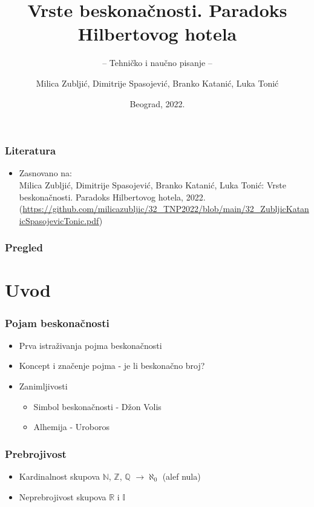 \documentclass{beamer}
\title{Vrste beskonačnosti. Paradoks Hilbertovog hotela}
\subtitle{-- Tehničko i naučno pisanje --}
\author{Milica Zubljić, Dimitrije Spasojević, Branko Katanić, Luka Tonić}
\institute{Matematički fakultet\\Univerzitet u Beogradu}
\date{
	\footnotesize{Beograd, 2022.}	
}
\begin{document}
\begin{frame}
	\thispagestyle{empty}
	\titlepage
\end{frame}

\addtocounter{framenumber}{-1}

\begin{frame}[fragile]\frametitle{Literatura}
	\begin{itemize}
		\item Zasnovano na:\\
		Milica Zubljić, Dimitrije Spasojević, Branko Katanić, Luka Tonić: Vrste beskonačnosti. Paradoks Hilbertovog hotela, 2022.\\
		(\url{https://github.com/milicazubljic/32_TNP2022/blob/main/32_ZubljicKatanicSpasojevicTonic.pdf})
	\end{itemize}
\end{frame}

\begin{frame}
	\frametitle{Pregled} 
	\tableofcontents[hidesubsections] 
\end{frame}

\section{Uvod}
\begin{frame}
    \frametitle{Pojam beskonačnosti}
    \begin{itemize}
        \item Prva istraživanja pojma beskonačnosti
        \item Koncept i značenje pojma - je li beskonačno broj?
        \item Zanimljivosti
        \begin{itemize}
            \item Simbol beskonačnosti - Džon Volis
            \item Alhemija - Uroboros
        \end{itemize}
    \end{itemize}
\end{frame}

\begin{frame}
    \frametitle{Prebrojivost}
    \begin{itemize}
        \item Kardinalnost skupova $\mathbb{N}$, $\mathbb{Z}$, $\mathbb{Q}$ $\rightarrow \aleph_{0}$ (alef nula)
        \item Neprebrojivost skupova $\mathbb{R}$ i $\mathbb{I}$
    \end{itemize}
\end{frame}
\end{document}
